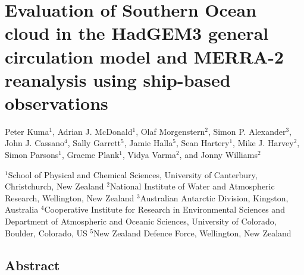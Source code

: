 \chapter{Evaluation of Southern Ocean cloud in the HadGEM3 general
circulation model and MERRA-2 reanalysis using ship-based
observations}

\vspace{-0.1cm}\begin{spacing}{1.2}\sffamily\raggedright
Peter Kuma$^1$, Adrian J. McDonald$^1$, Olaf Morgenstern$^2$, Simon P.  Alexander$^3$, John J. Cassano$^4$, Sally Garrett$^5$, Jamie Halla$^5$, Sean Hartery$^1$, Mike J. Harvey$^2$, Simon Parsons$^1$, Graeme Plank$^1$, Vidya Varma$^2$, and Jonny Williams$^2$
\end{spacing}

\vspace{0.4cm}\begin{spacing}{1.2}\footnotesize\sffamily\noindent\raggedright
$^1$School of Physical and Chemical Sciences, University of Canterbury, Christchurch, New Zealand\hfill\break
$^2$National Institute of Water and Atmospheric Research, Wellington, New Zealand\hfill\break
$^3$Australian Antarctic Division, Kingston, Australia\hfill\break
$^4$Cooperative Institute for Research in Environmental Sciences and Department of Atmospheric and Oceanic Sciences, University of Colorado, Boulder, Colorado,
US\hfill\break
$^5$New Zealand Defence Force, Wellington, New Zealand
\end{spacing}
\vspace{-0.1cm}

\section*{Abstract}

